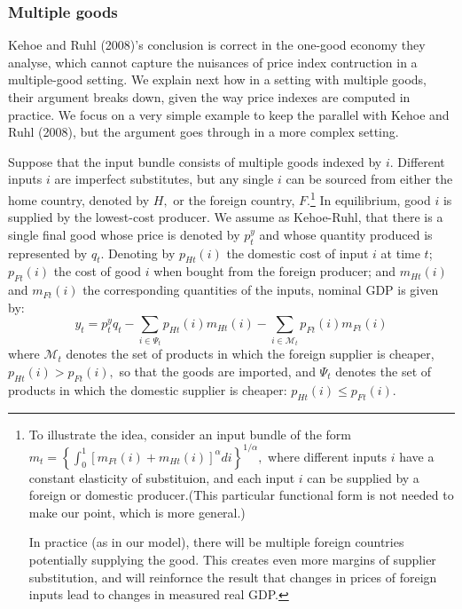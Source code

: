 \documentclass[12pt]{article}
\begin{document}
\subsubsection{Multiple goods}

Kehoe and Ruhl (2008)'s conclusion is correct in the one-good economy they
analyse, which cannot capture the nuisances of price index contruction in a
multiple-good setting. We explain next how in a setting with multiple goods,
their argument breaks down, given the way price indexes are computed in
practice. We focus on a very simple example to keep the parallel with Kehoe
and Ruhl (2008), but the argument goes through in a more complex setting.

Suppose that the input bundle consists of multiple goods indexed by $i$.
Different inputs $i$ are imperfect substitutes, but any single $i$ can be
sourced from either the home country, denoted by $H,$ or the foreign
country, $F$.\footnote{%
To illustrate the idea, consider an input bundle of the form $m_{t}=\left\{
\int_{0}^{1}[m_{Ft}(i)+m_{Ht}(i)]^{\alpha }di\right\} ^{1/\alpha },$ where
different inputs $i$ have a constant elasticity of substituion, and each
input $i$ can be supplied by a foreign or domestic producer.(This particular
functional form is not needed to make our point, which is more general.)
\par
In practice (as in our model), there will be multiple foreign countries
potentially supplying the good. This creates even more margins of supplier
substitution, and will reinfornce the result that changes in prices of
foreign inputs lead to changes in measured real GDP.} In equilibrium, good $i
$ is supplied by the lowest-cost producer. We assume as Kehoe-Ruhl, that
there is a single final good whose price is denoted by $p_{t}^{y}$ and whose
quantity produced is represented by $q_{t}$. Denoting by $p_{Ht}(i)$ the
domestic cost of input $i$ at time $t$; $p_{Ft}(i)$ the cost of good $i$
when bought from the foreign producer; and $m_{Ht}(i)$ and $m_{Ft}(i)$ the
corresponding quantities of the inputs, nominal GDP is given by: 
\begin{equation}
y_{t}=p_{t}^{y}q_{t}-\sum\limits_{i\in \mathcal{\Psi }%
_{t}}p_{Ht}(i)m_{Ht}(i)-\sum\limits_{i\in \mathcal{M}_{t}}p_{Ft}(i)m_{Ft}(i)
\label{nominal}
\end{equation}%
where $\mathcal{M}_{t}$ denotes the set of products in which the foreign
supplier is cheaper, $p_{Ht}(i)>p_{Ft}(i),$ so that the goods are imported,
and $\mathcal{\Psi }_{t}$ denotes the set of products in which the domestic
supplier is cheaper: $p_{Ht}(i)\leq p_{Ft}(i)$.
\end{document}
